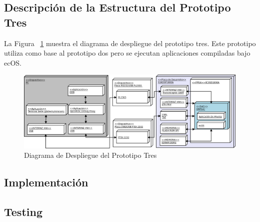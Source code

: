 \newpage
		
		\subsection{Descripción de la Estructura del Prototipo Tres}
		La Figura ~\ref{fig:ecos} muestra el diagrama de despliegue del prototipo tres. Este prototipo utiliza como base al prototipo dos pero se ejecutan 
		aplicaciones compiladas bajo ecOS.
		
		\begin{figure}[h!]
 		\begin{center}
  		\includegraphics[width=1\textwidth,keepaspectratio=true]{./images/ecos}
  		\caption{Diagrama de Despliegue del Prototipo Tres}
  		\label{fig:ecos} 
 		\end{center}
		\end{figure}
	
		\subsection{Implementación}	
		
		\newpage
		
		\subsection{Testing}


